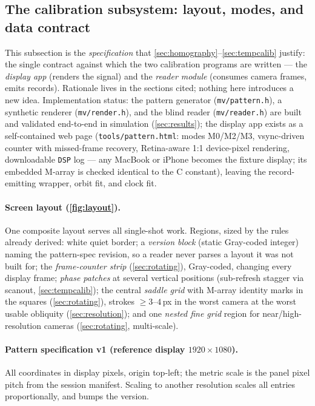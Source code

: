 \documentclass[11pt]{article}
\theoremstyle{definition}
\newcommand{\code}[1]{\texttt{#1}}
\begin{document}
\subsection{The calibration subsystem: layout, modes, and data contract}
\label{sec:calibspec}

This subsection is the \emph{specification} that
\autoref{sec:homography}--\autoref{sec:tempcalib} justify: the single
contract against which the two calibration programs are written --- the
\emph{display app} (renders the signal) and the \emph{reader module}
(consumes camera frames, emits records). Rationale lives in the sections
cited; nothing here introduces a new idea. Implementation status: the
pattern generator (\code{mv/pattern.h}), a synthetic renderer
(\code{mv/render.h}), and the blind reader (\code{mv/reader.h}) are
built and validated end-to-end in simulation (\autoref{sec:results});
the display app exists as a self-contained web page
(\code{tools/pattern.html}: modes M0/M2/M3, vsync-driven counter with
missed-frame recovery, Retina-aware 1:1 device-pixel rendering,
downloadable \code{DSP} log --- any MacBook or iPhone becomes the
fixture display; its embedded M-array is checked identical to the C
constant), leaving the record-emitting wrapper, orbit fit, and clock
fit.

\paragraph{Screen layout (\autoref{fig:layout}).} One composite layout
serves all single-shot work. Regions, sized by the rules already
derived: white quiet border; a \emph{version block} (static Gray-coded
integer) naming the pattern-spec revision, so a reader never parses a
layout it was not built for; the \emph{frame-counter strip}
(\autoref{sec:rotating}), Gray-coded, changing every display frame;
\emph{phase patches} at several vertical positions (sub-refresh stagger
via scanout, \autoref{sec:tempcalib}); the central \emph{saddle grid}
with M-array identity marks in the squares (\autoref{sec:rotating}),
strokes $\ge3$--$4$\,px in the worst camera at the worst usable
obliquity (\autoref{sec:resolution}); and one \emph{nested fine grid}
region for near/high-resolution cameras (\autoref{sec:rotating},
multi-scale).

\paragraph{Pattern specification v1 (reference display
$1920\times1080$).} All coordinates in display pixels, origin top-left;
the metric scale is the panel pixel pitch from the session manifest.
Scaling to another resolution scales all entries proportionally, and
bumps the version.
\end{document}
